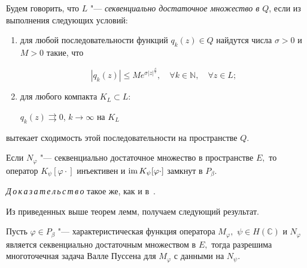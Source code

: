  \begin{definition}[2]Будем говорить, что $L$ "--- \textit{секвенциально достаточное множество в $Q$}, если из выполнения следующих условий:

\begin{enumerate}

\item[{\rm 1)}] для любой последовательности функций $q_k(z) \in Q$ найдутся числа ${\sigma>0}$ и $M>0$ такие, что

$$

\left|q_k(z)\right|\leq Me^{\sigma\left|z\right|^\frac{\beta}{2}},\quad  \forall k\in \mathbb{N},\quad \forall z\in L;$$




\item[{\rm 2)}] для любого компакта $K_L\subset L$:

$

q_k(z)\rightrightarrows 0$, $k\to \infty$   на $K_L$

\end{enumerate}

вытекает сходимость этой последовательности на пространстве $Q$.

\end{definition}



\smallskip



 \begin{theorem}[3]Если $N_\varphi$ "--- секвенциально достаточное множество в пространстве $E,$ то оператор $K_\psi [\varphi \cdot]$ инъективен и $\mathop {\rm im} K_\psi [\varphi \cdot]$ замкнут в $P_\beta.$

 \end{theorem}



\smallskip



\textit{Д\,о\,к\,а\,з\,а\,т\,е\,л\,ь\,с\,т\,в\,о} такое же, как и в~\cite{napal:bib18}.



\smallskip



Из приведенных выше теорем  лемм, получаем следующий результат.

  \begin{theorem}[4]Пусть $\varphi \in P_\beta$ "--- характеристическая функция оператора $M_\varphi,$ $\psi \in H(\mathbb{C})$ и $N_\varphi$ является секвенциально достаточным множеством в $E,$ тогда разрешима многоточечная задача Валле Пуссена для $M_\varphi$ с данными на $N_\psi.$

 \end{theorem}



